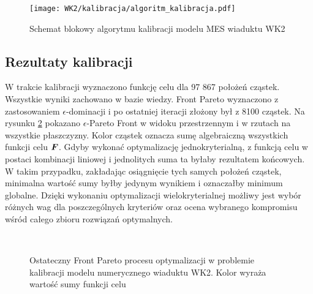 \begin{figure}[p]
	\centering
	\texttt{[image: WK2/kalibracja/algoritm\_kalibracja.pdf]}
	\captionsetup{justification=centering}
	\caption{Schemat blokowy algorytmu kalibracji modelu MES wiaduktu WK2}
	\label{fig:kalibracja_algoritm}
\end{figure}


\subsection{Rezultaty kalibracji}
W trakcie kalibracji wyznaczono funkcję celu dla 97 867 położeń cząstek. Wszystkie wyniki zachowano w bazie wiedzy. Front Pareto wyznaczono z zastosowaniem $\epsilon$-dominacji i po ostatniej iteracji złożony był z 8100 cząstek. Na rysunku \ref{fig: calibration_pareto} pokazano $\epsilon$-Pareto Front w widoku przestrzennym i w rzutach na wszystkie płaszczyzny. Kolor cząstek oznacza sumę algebraiczną wszystkich funkcji celu $\bm{F}$. Gdyby wykonać optymalizację jednokryterialną, z funkcją celu w postaci kombinacji liniowej i jednolitych suma ta byłaby rezultatem końcowych. W takim przypadku, zakładając osiągnięcie tych samych położeń cząstek, minimalna wartość sumy byłby jedynym wynikiem i oznaczałby minimum globalne. Dzięki wykonaniu optymalizacji wielokryterialnej możliwy jest wybór różnych wag dla poszczególnych kryteriów oraz ocena wybranego kompromisu wśród całego zbioru rozwiązań optymalnych.

\begin{figure}[hbt!]
	\centering
	 \\
	\captionsetup{justification=centering}
	\caption{Ostateczny Front Pareto procesu optymalizacji w problemie kalibracji modelu numerycznego wiaduktu WK2. Kolor wyraża wartość sumy funkcji celu}
	\label{fig: calibration_pareto}
\end{figure}


